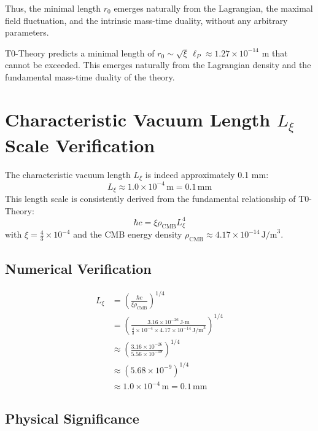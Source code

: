 \documentclass[12pt,a4paper]{article}
\numberwithin{equation}{section}
\begin{document}
	Thus, the minimal length $r_0$ emerges naturally from the Lagrangian, the maximal field fluctuation, and the intrinsic mass-time duality, without any arbitrary parameters.
	
	\begin{revolutionary}
		T0-Theory predicts a minimal length of $r_0 \sim \sqrt{\xi} \, \ell_P \approx 1.27 \times 10^{-14}$ m that cannot be exceeded. This emerges naturally from the Lagrangian density and the fundamental mass-time duality of the theory.
	\end{revolutionary}
	
	\section*{Characteristic Vacuum Length $L_\xi$ Scale Verification}
	
	\begin{important}
		The characteristic vacuum length $L_\xi$ is indeed approximately 0.1 mm:
		\[
		L_\xi \approx 1.0 \times 10^{-4}\,\text{m} = 0.1\,\text{mm}
		\]
		This length scale is consistently derived from the fundamental relationship of T0-Theory:
		\[
		\hbar c = \xi \rho_{\text{CMB}} L_\xi^4
		\]
		with $\xi = \frac{4}{3} \times 10^{-4}$ and the CMB energy density $\rho_{\text{CMB}} \approx 4.17 \times 10^{-14}\,\text{J/m}^3$.
	\end{important}
	
	\subsection*{Numerical Verification}
	
	\begin{align*}
		L_\xi &= \left(\frac{\hbar c}{\xi \rho_{\text{CMB}}}\right)^{1/4} \\
		&= \left(\frac{3.16 \times 10^{-26}\,\text{J·m}}{\frac{4}{3} \times 10^{-4} \times 4.17 \times 10^{-14}\,\text{J/m}^3}\right)^{1/4} \\
		&\approx \left(\frac{3.16 \times 10^{-26}}{5.56 \times 10^{-18}}\right)^{1/4} \\
		&\approx \left(5.68 \times 10^{-9}\right)^{1/4} \\
		&\approx 1.0 \times 10^{-4}\,\text{m} = 0.1\,\text{mm}
	\end{align*}
	
	\subsection*{Physical Significance}
	
\end{document}
